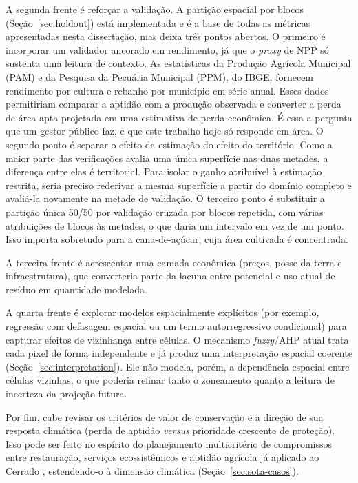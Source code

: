 A segunda frente é reforçar a validação. A partição espacial por blocos (Seção~\ref{sec:holdout}) está
implementada e é a base de todas as métricas apresentadas nesta dissertação, mas deixa três pontos
abertos. O primeiro é incorporar um validador ancorado em rendimento, já que o \emph{proxy} de NPP só
sustenta uma leitura de contexto. As estatísticas da Produção Agrícola Municipal (PAM) e da Pesquisa da
Pecuária Municipal (PPM), do IBGE, fornecem rendimento por cultura e rebanho por município em série
anual. Esses dados permitiriam comparar a aptidão com a produção observada e converter a perda de área
apta projetada em uma estimativa de perda econômica. É essa a pergunta que um gestor público faz, e que
este trabalho hoje só responde em área. O segundo ponto é separar o efeito da estimação do efeito do
território. Como a maior parte das verificações avalia uma única superfície nas duas metades, a
diferença entre elas é territorial. Para isolar o ganho atribuível à estimação restrita, seria preciso
rederivar a mesma superfície a partir do domínio completo e avaliá-la novamente na metade de validação.
O terceiro ponto é substituir a partição única 50/50 por validação cruzada por blocos repetida, com
várias atribuições de blocos às metades, o que daria um intervalo em vez de um ponto. Isso importa
sobretudo para a cana-de-açúcar, cuja área cultivada é concentrada.

A terceira frente é acrescentar uma camada econômica (preços, posse da terra e infraestrutura), que
converteria parte da lacuna entre potencial e uso atual de resíduo em quantidade modelada.

A quarta frente é explorar modelos espacialmente explícitos (por exemplo, regressão com defasagem
espacial ou um termo autorregressivo condicional) para capturar efeitos de vizinhança entre
células. O mecanismo \emph{fuzzy}/AHP atual trata cada pixel de forma independente e já produz uma
interpretação espacial coerente (Seção~\ref{sec:interpretation}). Ele não modela, porém, a dependência
espacial entre células vizinhas, o que poderia refinar tanto o zoneamento quanto a leitura de incerteza
da projeção futura.

Por fim, cabe revisar os critérios de valor de conservação e a direção de sua resposta climática (perda
de aptidão \emph{versus} prioridade crescente de proteção). Isso pode ser feito no espírito do
planejamento multicritério de compromissos entre restauração, serviços ecossistêmicos e aptidão
agrícola já aplicado ao Cerrado \citep{schuler_spatial_2022}, estendendo-o à dimensão climática
(Seção~\ref{sec:sota-casos}).

